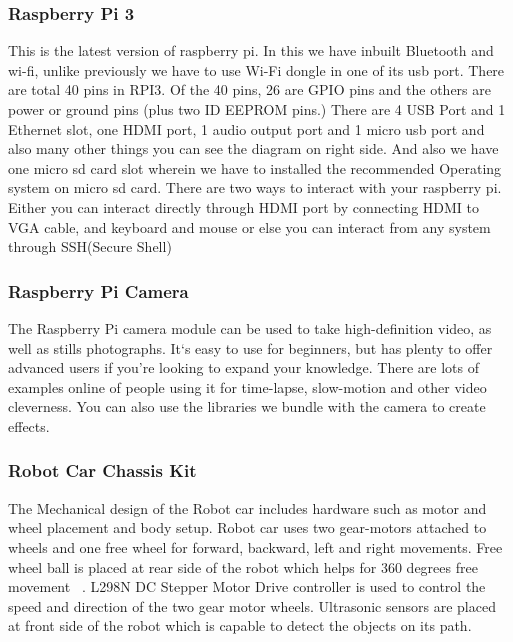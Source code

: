 \documentclass[sigconf]{acmart}
\begin{document}
\subsubsection{Raspberry Pi 3}
This is the latest version of raspberry pi. In this we have inbuilt Bluetooth and wi-fi, unlike previously we have to use Wi-Fi dongle in one of its usb port. There are total 40 pins in RPI3. Of the 40 pins, 26 are GPIO pins and the others are power or ground pins (plus two ID EEPROM pins.) There are 4 USB Port and 1 Ethernet slot, one HDMI port, 1 audio output port and 1 micro usb port and also many other things you can see the diagram on right side. And also we have one micro sd card slot wherein we have to installed the recommended Operating system on micro sd card. There are two ways to interact with your raspberry pi. Either you can interact directly through HDMI port by connecting HDMI to VGA cable, and keyboard and mouse or else you can interact from any system through SSH(Secure Shell)

\subsubsection{Raspberry Pi Camera}
The Raspberry Pi camera module can be used to take high-definition video, as well as stills photographs. It`s easy to use for beginners, but has plenty to offer advanced users if you’re looking to expand your knowledge. There are lots of examples online of people using it for time-lapse, slow-motion and other video cleverness. You can also use the libraries we bundle with the camera to create effects.

\subsubsection{Robot Car Chassis Kit}
The Mechanical design of the Robot car includes hardware such as motor and wheel placement and body setup. Robot car uses two gear-motors attached to wheels and one free wheel for forward, backward, left and right movements. Free wheel ball is placed at rear side of the robot which helps for 360 degrees free movement ~\cite{arduino2015}. L298N DC Stepper Motor Drive controller is used to control the speed and direction of the two gear motor wheels. Ultrasonic sensors are placed at front side of the robot which is capable to detect the objects on its path.
\end{document}
